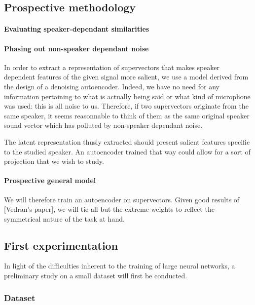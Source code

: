\documentclass[conference]{IEEEtran}
\begin{document}
\subsection{Prospective methodology}
\label{subsec:prosp}

\paragraph{Evaluating speaker-dependant similarities}


\paragraph{Phasing out non-speaker dependant noise}

In order to extract a representation of supervectors that makes speaker
dependent features of the given signal more salient, we use a model derived from
the design of a denoising autoencoder. Indeed, we have no need for any
information pertaining to what is actually being said or what kind of microphone
was used: this is all noise to us. Therefore, if two supervectors originate from
the same speaker, it seems reasonnable to think of them as the same original \og
speaker\fg{} sound vector which has polluted by non-speaker dependant noise.

The latent representation thusly extracted should present salient features
specific to the studied speaker. An autoencoder trained that way could allow for
a sort of projection that we wish to study.

\paragraph{Prospective general model}

We will therefore train an autoencoder on supervectors. Given good results of
[Vedran's paper], we will tie all but the extreme weights to reflect the
symmetrical nature of the task at hand.

\subsection{First experimentation}

In light of the difficulties inherent to the training of large neural networks,
a preliminary study on a small dataset will first be conducted.

\subsubsection{Dataset}
\end{document}
